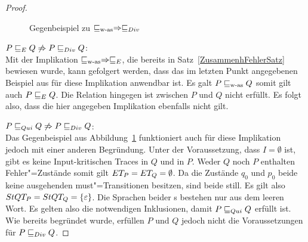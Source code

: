 \begin{proof}
\begin{figure}[htbp]
\begin{center}
      \caption{Gegenbeispiel zu $\sqsubseteq _{\mathrm{w}\text{-}\mathrm{as}} \Rightarrow  \sqsubseteq  _{Div}$}
      \label{wasDivGegenBsp}
    \end{center}
  \end{figure}

  $P  \sqsubseteq  _E Q \not\Rightarrow P  \sqsubseteq  _{Div} Q$:\\
  Mit der Implikation $\sqsubseteq _{\mathrm{w}\text{-}\mathrm{as}} \Rightarrow  \sqsubseteq  _E$, die bereits in
  Satz~\ref{ZusammenhFehlerSatz} bewiesen wurde, kann gefolgert werden, dass
  das im letzten Punkt angegebenen Beispiel aus für diese Implikation anwendbar
  ist. Es galt $P \sqsubseteq _{\mathrm{w}\text{-}\mathrm{as}} Q$ somit gilt auch $P  \sqsubseteq  _E Q$. Die Relation \DRel{}
  hingegen ist zwischen $P$ und $Q$ nicht erfüllt. Es folgt also, dass die hier
  angegeben Implikation ebenfalls nicht gilt.

  $P  \sqsubseteq  _{Qui} Q \not\Rightarrow P  \sqsubseteq  _{Div} Q$:\\
  Das Gegenbeispiel aus Abbildung~\ref{wasDivGegenBsp} funktioniert auch für
  diese Implikation jedoch mit einer anderen Begründung. Unter der
  Voraussetzung, dass $I=\emptyset$ ist, gibt es keine Input-kritischen Traces
  in $Q$ und in $P$. Weder $Q$ noch $P$ enthalten Fehler"=Zustände somit gilt
  $ET _P = ET _Q = \emptyset$. Da die Zustände $q_0$ und $p_0$ beide keine
  ausgehenden must"=Transitionen besitzen, sind beide still. Es gilt also
  $StQT _P = StQT _Q = \{\varepsilon\}$. Die Sprachen beider \MEIO{}s
  bestehen nur aus dem leeren Wort. Es gelten also die notwendigen
  Inklusionen, damit $P  \sqsubseteq  _{Qui} Q$ erfüllt ist. Wie bereits begründet wurde,
  erfüllen $P$ und $Q$ jedoch nicht die Voraussetzungen für $P  \sqsubseteq  _{Div} Q$.


\end{proof}
